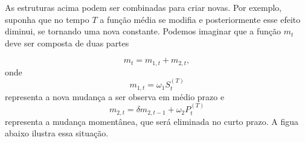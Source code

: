 \documentclass[
  letterpaper,
  DIV=11,
  numbers=noendperiod]{scrartcl}
\theoremstyle{plain}
\theoremstyle{plain}
\theoremstyle{definition}
\theoremstyle{definition}
\theoremstyle{remark}
\begin{document}
\begin{figure}

\begin{minipage}[t]{\linewidth}

{\centering 


}

\end{minipage}%

\end{figure}

As estruturas acima podem ser combinadas para criar novas. Por exemplo,
suponha que no tempo \(T\) a função média se modifia e posteriormente
esse efeito diminui, se tornando uma nova constante. Podemos imaginar
que a função \(m_t\) deve ser composta de duas partes

\[m_t = m_{1,t}+m_{2,t},\] onde \[m_{1,t}=\omega_1 S_{t}^{(T)}\]
representa a nova mudança a ser observa em médio prazo e
\[m_{2,t}=\delta m_{2,t-1}+\omega_2 P_{t}^{(T)}\] representa a mudança
momentânea, que será eliminada no curto prazo. A figua abaixo ilustra
essa situação.
\end{document}
